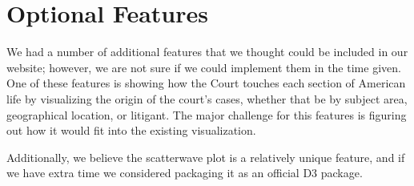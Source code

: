 \documentclass{article}
\begin{document}
\section{Optional Features}
We had a number of additional features that we thought could be included in our website; however, we are not sure if we could implement them in the time given.  One of these features is showing how the Court touches each section of American life by visualizing the origin of the court's cases, whether that be by subject area, geographical location, or litigant.  The major challenge for this features is figuring out how it would fit into the existing visualization.

Additionally, we believe the scatterwave plot is a relatively unique feature, and if we have extra time we considered packaging it as an official D3 package.
\end{document}
